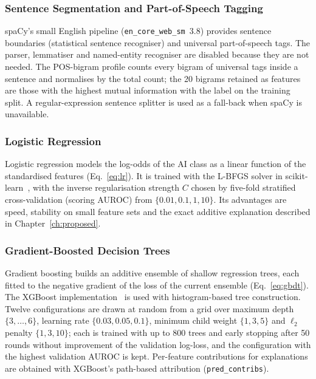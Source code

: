 \subsubsection{Sentence Segmentation and Part-of-Speech Tagging}

spaCy's small English pipeline (\texttt{en\_core\_web\_sm}~3.8) provides
sentence boundaries (statistical sentence recogniser) and universal
part-of-speech tags. The parser, lemmatiser and named-entity recogniser are
disabled because they are not needed. The POS-bigram profile counts every
bigram of universal tags inside a sentence and normalises by the total count;
the 20 bigrams retained as features are those with the highest mutual
information with the label on the training split. A regular-expression
sentence splitter is used as a fall-back when spaCy is unavailable.

\subsubsection{Logistic Regression}

Logistic regression models the log-odds of the AI class as a linear function
of the standardised features (Eq.~\eqref{eq:lr}). It is trained with the
L-BFGS solver in scikit-learn~\cite{pedregosa2011sklearn}, with the inverse
regularisation strength $C$ chosen by five-fold stratified cross-validation
(scoring AUROC) from $\{0.01, 0.1, 1, 10\}$. Its advantages are speed,
stability on small feature sets and the exact additive explanation described
in Chapter~\ref{ch:proposed}.

\subsubsection{Gradient-Boosted Decision Trees}

Gradient boosting builds an additive ensemble of shallow regression trees,
each fitted to the negative gradient of the loss of the current ensemble
(Eq.~\eqref{eq:gbdt}). The XGBoost implementation~\cite{chen2016xgboost} is
used with histogram-based tree construction. Twelve configurations are drawn
at random from a grid over maximum depth $\{3,\dots,6\}$, learning rate
$\{0.03, 0.05, 0.1\}$, minimum child weight $\{1,3,5\}$ and $\ell_2$ penalty
$\{1,3,10\}$; each is trained with up to 800 trees and early stopping after 50
rounds without improvement of the validation log-loss, and the configuration
with the highest validation AUROC is kept. Per-feature contributions for
explanations are obtained with XGBoost's path-based attribution
(\texttt{pred\_contribs}).

